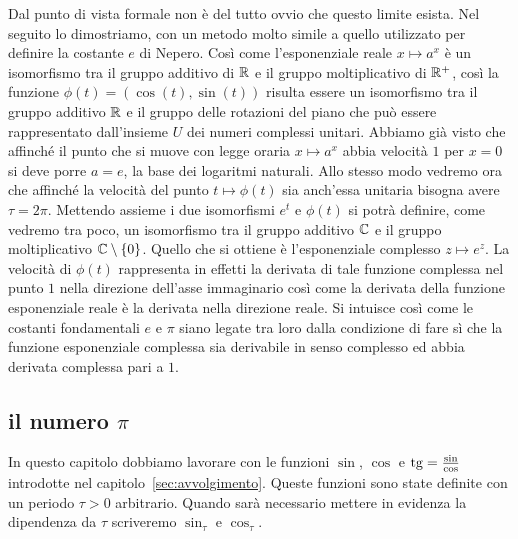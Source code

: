 Dal punto di vista formale non è del tutto ovvio che questo limite esista.
Nel seguito lo dimostriamo, con un metodo molto simile a quello utilizzato 
per definire la costante $e$ di Nepero.
Così come l'esponenziale reale $x\mapsto a^x$ 
è un isomorfismo tra il gruppo additivo di ${\mathbb R}$ e il gruppo moltiplicativo 
di ${\mathbb R}^+$, così la funzione $\phi(t) = (\cos(t), \sin(t))$ 
risulta essere un isomorfismo 
tra il gruppo additivo ${\mathbb R}$ e il gruppo delle rotazioni del piano che può essere 
rappresentato dall'insieme $U$ dei numeri complessi unitari.
Abbiamo già visto che affinché il punto che si muove con legge 
oraria $x\mapsto a^x$ abbia velocità $1$ per $x=0$ 
si deve porre $a=e$, la base dei logaritmi naturali.
Allo stesso modo vedremo ora che affinché la velocità 
del punto $t\mapsto \phi(t)$ 
sia anch'essa unitaria bisogna avere $\tau = 2\pi$.
Mettendo assieme i due isomorfismi $e^t$ e $\phi(t)$ si potrà definire,
come vedremo tra poco, un isomorfismo tra il gruppo additivo ${\mathbb C}$ 
e il gruppo moltiplicativo ${\mathbb C}\setminus{\left\{ 0 \right\}}$.
Quello che si ottiene è l'esponenziale complesso $z\mapsto e^z$. 
La velocità di $\phi(t)$ rappresenta in effetti la derivata di tale funzione 
complessa nel punto $1$ nella direzione dell'asse immaginario 
così come la derivata della funzione esponenziale reale è la derivata 
nella direzione reale. 
Si intuisce così come le costanti fondamentali $e$ e $\pi$ siano legate 
tra loro dalla condizione di fare sì che la funzione esponenziale complessa 
sia derivabile in senso complesso ed abbia derivata complessa pari a $1$.

\subsection{il numero $\pi$}

In questo capitolo dobbiamo lavorare con le funzioni 
$\sin$, $\cos$ e $\operatorname{tg}=\frac{\sin }{\cos}$ introdotte 
nel capitolo~\ref{sec:avvolgimento}. 
Queste funzioni sono state definite con un periodo $\tau>0$
arbitrario. 
Quando sarà necessario mettere in evidenza 
la dipendenza da $\tau$ scriveremo $\sin_\tau$ 
e $\cos_\tau$.

